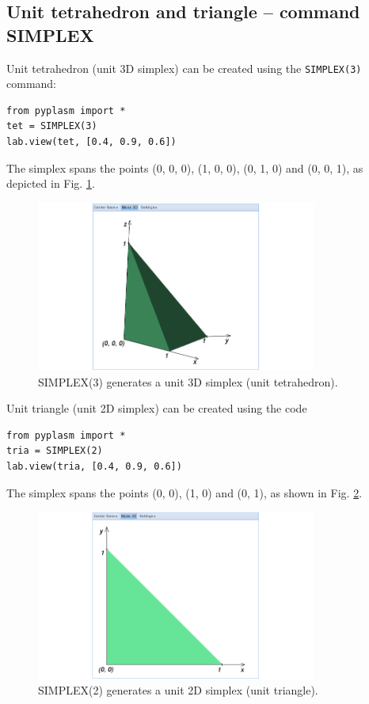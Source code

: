 \documentclass{article}
\begin{document}
\subsection{Unit tetrahedron and triangle -- command SIMPLEX}

Unit tetrahedron (unit 3D simplex) can be created using the 
{\tt SIMPLEX(3)} command:
\begin{verbatim}
from pyplasm import *
tet = SIMPLEX(3)
lab.view(tet, [0.4, 0.9, 0.6])
\end{verbatim}
The simplex spans the points (0, 0, 0), (1, 0, 0), (0, 1, 0) and (0, 0, 1),
as depicted in Fig. \ref{fig:simplex-1}.
\newpage

\begin{figure}[!ht]
\begin{center}
\includegraphics[width=0.82\textwidth]{img/simplex-1.png}
\end{center}
\vspace{-2mm}
\caption{SIMPLEX(3) generates a unit 3D simplex (unit tetrahedron).}
\label{fig:simplex-1}
\end{figure}
\noindent
Unit triangle (unit 2D simplex) can be created using the code
\begin{verbatim}
from pyplasm import *
tria = SIMPLEX(2)
lab.view(tria, [0.4, 0.9, 0.6])
\end{verbatim}
The simplex spans the points (0, 0), (1, 0) and (0, 1), as shown in 
Fig. \ref{fig:simplex-2}.
\newpage

\begin{figure}[!ht]
\begin{center}
\includegraphics[width=0.82\textwidth]{img/simplex-2.png}
\end{center}
\vspace{-2mm}
\caption{SIMPLEX(2) generates a unit 2D simplex (unit triangle).}
\label{fig:simplex-2}
\end{figure}
\noindent
\end{document}
